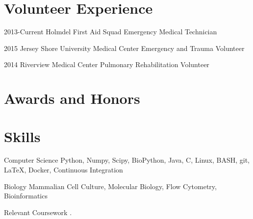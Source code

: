 \documentclass{bscv}
\begin{document}
\section{Volunteer Experience}

\begin{eventlist}
\item{2013-Current}
  {Holmdel First Aid Squad}
  {Emergency Medical Technician}
\item{2015}
  {Jersey Shore University Medical Center}
  {Emergency and Trauma Volunteer}
\item{2014}
  {Riverview Medical Center}
  {Pulmonary Rehabilitation Volunteer}
  
\end{eventlist}

\section{Awards and Honors}
\begin{yearlist}
\end{yearlist}

\section{Skills}

\begin{factlist}

\item{Computer Science}
     {Python, Numpy, Scipy, BioPython, Java, C, Linux, BASH, git, \LaTeX, Docker, Continuous Integration}

\item{Biology}
  { Mammalian Cell Culture, Molecular Biology, Flow Cytometry, Bioinformatics }

\item{Relevant Coursework}
  { . }
\end{factlist}
  
\end{document}

